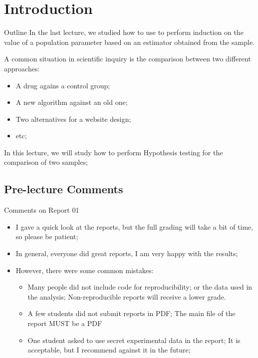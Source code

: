 \section{Introduction}

\begin{frame}{Outline}
  In the last lecture, we studied how to use  to perform induction on the value of a population parameter based on an estimator obtained from the sample.\bigskip

  A common situation in scientific inquiry is the comparison between two different approaches:
  \begin{itemize}
    \item A drug agains a control group;
    \item A new algorithm against an old one;
    \item Two alternatives for a website design;
    \item etc;
  \end{itemize}
  \bigskip

  In this lecture, we will study how to perform Hypothesis testing for the comparison of two samples;
\end{frame}

\subsection{Pre-lecture Comments}

\begin{frame}{Comments on Report 01}
  \begin{itemize}
    \item I gave a quick look at the reports, but the full grading will take a bit of time, so please be patient;
    \item In general, everyone did great reports, I am very happy with the results;
    \item However, there were some common mistakes:
    \begin{itemize}
      \item Many people did not include code for reproducibility; or the data used in the analysis; \alert{Non-reproducible reports will receive a lower grade}.
      \item A few students did not submit reports in PDF; \alert{The main file of the report MUST be a PDF}
      \item One student asked to use secret experimental data in the report; \alert{It is acceptable, but I recommend against it in the future};
    \end{itemize}
  \end{itemize}
\end{frame}

